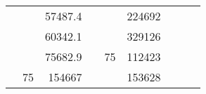 \begin{table}[H]
\begin{tabular}{|ccrccrccc}
\multicolumn{1}{|c|}{\cellcolor[HTML]{FFFFC7}}                                & \multicolumn{1}{c|}{\cellcolor[HTML]{DAE8FC}}                      & \multicolumn{1}{r|}{\cellcolor[HTML]{DAE8FC}57487.4}   & \multicolumn{1}{c|}{\cellcolor[HTML]{FFFFC7}}                                & \multicolumn{1}{c|}{\cellcolor[HTML]{DAE8FC}}                       & \multicolumn{1}{r|}{\cellcolor[HTML]{DDFDFF}224692}    &                                                                              &                                                                    &                                                        \\ \cline{3-3} \cline{6-6}
\multicolumn{1}{|c|}{\cellcolor[HTML]{FFFFC7}}                                & \multicolumn{1}{c|}{\cellcolor[HTML]{DAE8FC}}                      & \multicolumn{1}{r|}{\cellcolor[HTML]{DDFDFF}60342.1}   & \multicolumn{1}{c|}{\cellcolor[HTML]{FFFFC7}}                                & \multicolumn{1}{c|}{\cellcolor[HTML]{DAE8FC}}                       & \multicolumn{1}{r|}{\cellcolor[HTML]{DAE8FC}329126}    &                                                                              &                                                                    &                                                        \\ \cline{3-3} \cline{6-6}
\multicolumn{1}{|c|}{\cellcolor[HTML]{FFFFC7}}                                & \multicolumn{1}{c|}{\cellcolor[HTML]{DAE8FC}}                      & \multicolumn{1}{r|}{\cellcolor[HTML]{DAE8FC}75682.9}   & \multicolumn{1}{c|}{\cellcolor[HTML]{FFFFC7}}                                & \multicolumn{1}{c|}{\multirow{-10}{*}{\cellcolor[HTML]{DAE8FC}75}}  & \multicolumn{1}{r|}{\cellcolor[HTML]{DDFDFF}112423}    &                                                                              &                                                                    &                                                        \\ \cline{3-3} \cline{5-6}
\multicolumn{1}{|c|}{\cellcolor[HTML]{FFFFC7}}                                & \multicolumn{1}{c|}{\multirow{-10}{*}{\cellcolor[HTML]{DAE8FC}75}} & \multicolumn{1}{r|}{\cellcolor[HTML]{DDFDFF}154667}    & \multicolumn{1}{c|}{\cellcolor[HTML]{FFFFC7}}                                & \multicolumn{1}{c|}{\cellcolor[HTML]{DDFDFF}}                       & \multicolumn{1}{r|}{\cellcolor[HTML]{DAE8FC}153628}    &                                                                              &                                                                    &                                                        \\ \cline{2-3} \cline{6-6}

\end{tabular}
\end{table}
